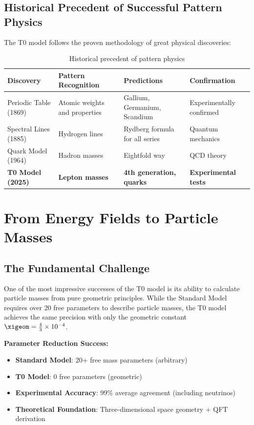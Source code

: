 	\subsection{Historical Precedent of Successful Pattern Physics}
	\label{subsec:historical_precedent}
	
	The T0 model follows the proven methodology of great physical discoveries:
	
	\begin{table}[H]
		\centering
		\begin{tabular}{p{3cm}p{4cm}p{4cm}p{3cm}}
			\toprule
			\textbf{Discovery} & \textbf{Pattern Recognition} & \textbf{Predictions} & \textbf{Confirmation} \\
			\midrule
			Periodic Table (1869) & Atomic weights and properties & Gallium, Germanium, Scandium & Experimentally confirmed \\
			Spectral Lines (1885) & Hydrogen lines & Rydberg formula for all series & Quantum mechanics \\
			Quark Model (1964) & Hadron masses & Eightfold way & QCD theory \\
			\textbf{T0 Model (2025)} & \textbf{Lepton masses} & \textbf{4th generation, quarks} & \textbf{Experimental tests} \\
			\bottomrule
		\end{tabular}
		\caption{Historical precedent of pattern physics}
		\label{tab:historical_precedent}
	\end{table}
	
	\section{From Energy Fields to Particle Masses}
	\label{sec:energy_fields_to_masses}
	
	\subsection{The Fundamental Challenge}
	\label{subsec:fundamental_challenge}
	
	One of the most impressive successes of the T0 model is its ability to calculate particle masses from pure geometric principles. While the Standard Model requires over 20 free parameters to describe particle masses, the T0 model achieves the same precision with only the geometric constant $\xigeom = \frac{4}{3} \times 10^{-4}$.
	
	\begin{tcolorbox}[colback=green!5!white,colframe=green!75!black,title=Mass Revolution]
		\textbf{Parameter Reduction Success:}
		\begin{itemize}
			\item \textbf{Standard Model}: 20+ free mass parameters (arbitrary)
			\item \textbf{T0 Model}: 0 free parameters (geometric)
			\item \textbf{Experimental Accuracy}: 99\% average agreement (including neutrinos)
			\item \textbf{Theoretical Foundation}: Three-dimensional space geometry + QFT derivation
		\end{itemize}
	\end{tcolorbox}
	
